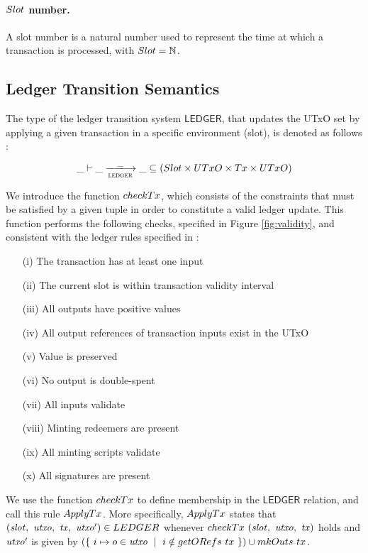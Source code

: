 \paragraph{$\Slot$ number. }  A slot number is a natural number used to represent
the time at which a transaction is processed, with $\Slot = \N$.

\subsection{Ledger Transition Semantics}
\label{sec:ledgersem}

The type of the ledger transition system $\mathsf{LEDGER}$, that updates the UTxO
set by applying a given transaction in a specific environment (slot), is
denoted as follows :

  \begin{equation*}
    \_ \vdash
    \var{\_} \trans{ledger}{\_} \var{\_}
    \subseteq (\Slot \times \UTxO \times \Tx \times \UTxO)
  \end{equation*}

We introduce the function $\fun{checkTx}$, which
consists of the constraints that must be satisfied by a given tuple
in order to constitute a valid ledger update. This function performs the following
checks, specified in Figure \ref{fig:validity}, and consistent with the ledger rules
specified in \cite{eutxoma} \cite{structured} :

\begin{itemize}
  \item[(i)] The transaction has at least one input
  \item[(ii)] The current slot is within transaction validity interval
  \item[(iii)] All outputs have positive values
  \item[(iv)] All output references of transaction inputs exist in the UTxO
  \item[(v)] Value is preserved
  \item[(vi)] No output is double-spent
  \item[(vii)] All inputs validate
  \item[(viii)] Minting redeemers are present
  \item[(ix)] All minting scripts validate
  \item[(x)] All signatures are present
\end{itemize}

We use the function $\fun{checkTx}$ to define membership in the
$\mathsf{LEDGER}$ relation, and call this rule $\fun{ApplyTx}$.
More specifically, $\fun{ApplyTx}$ states that
$(\var{slot},~\var{utxo},~\var{tx},~\var{utxo'}) \in \mathsf{LEDGER}$
whenever $\fun{checkTx}~(\var{slot},~\var{utxo},~\var{tx})$ holds and $\mathit{utxo'}$
is given by $(\{~i\mapsto o \in \var{utxo} ~\mid~ i \notin \fun{getORefs}~{tx}~\}) \cup \fun{mkOuts}~{tx} $.

